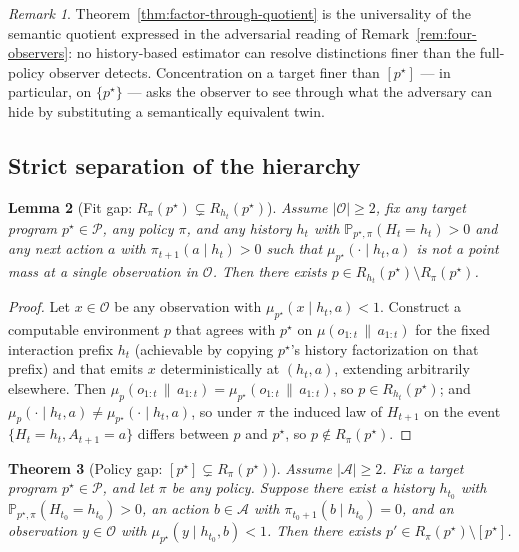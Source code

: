\documentclass[11pt]{article}
\newtheorem{theorem}{Theorem}[section]
\newtheorem{lemma}[theorem]{Lemma}
\theoremstyle{definition}
\theoremstyle{remark}
\newtheorem{remark}[theorem]{Remark}
\newcommand{\Acal}{\mathcal{A}}
\newcommand{\Ocal}{\mathcal{O}}
\newcommand{\Pcal}{\mathcal{P}}
\newcommand{\Prob}{\mathbb{P}}
\newcommand{\givena}{\,\|\,}
\begin{document}
\begin{remark}
Theorem~\ref{thm:factor-through-quotient} is the universality of the semantic quotient expressed in the adversarial reading of Remark~\ref{rem:four-observers}: no history-based estimator can resolve distinctions finer than the full-policy observer detects. Concentration on a target finer than $[p^\star]$ --- in particular, on $\{p^\star\}$ --- asks the observer to see through what the adversary can hide by substituting a semantically equivalent twin.
\end{remark}

\subsection{Strict separation of the hierarchy}

\begin{lemma}[{Fit gap: $R_\pi(p^\star)\subsetneq R_{h_t}(p^\star)$}]
\label{lem:fit-gap}
Assume $|\Ocal|\ge 2$, fix any target program $p^\star\in\Pcal$, any policy $\pi$, and any history $h_t$ with $\Prob_{p^\star,\pi}(H_t=h_t)>0$ and any next action $a$ with $\pi_{t+1}(a\mid h_t)>0$ such that $\mu_{p^\star}(\cdot\mid h_t,a)$ is not a point mass at a single observation in $\Ocal$. Then there exists $p\in R_{h_t}(p^\star)\setminus R_\pi(p^\star)$.
\end{lemma}

\begin{proof}
Let $x\in\Ocal$ be any observation with $\mu_{p^\star}(x\mid h_t,a)<1$. Construct a computable environment $p$ that agrees with $p^\star$ on $\mu(o_{1:t}\givena a_{1:t})$ for the fixed interaction prefix $h_t$ (achievable by copying $p^\star$'s history factorization on that prefix) and that emits $x$ deterministically at $(h_t,a)$, extending arbitrarily elsewhere. Then $\mu_p(o_{1:t}\givena a_{1:t})=\mu_{p^\star}(o_{1:t}\givena a_{1:t})$, so $p\in R_{h_t}(p^\star)$; and $\mu_p(\cdot\mid h_t,a)\neq \mu_{p^\star}(\cdot\mid h_t,a)$, so under $\pi$ the induced law of $H_{t+1}$ on the event $\{H_t=h_t,A_{t+1}=a\}$ differs between $p$ and $p^\star$, so $p\notin R_\pi(p^\star)$.
\end{proof}

\begin{theorem}[{Policy gap: $[p^\star]\subsetneq R_\pi(p^\star)$}]
\label{thm:policy-gap}
Assume $|\Acal|\ge 2$. Fix a target program $p^\star\in\Pcal$, and let $\pi$ be any policy. Suppose there exist a history $h_{t_0}$ with $\Prob_{p^\star,\pi}(H_{t_0}=h_{t_0})>0$, an action $b\in\Acal$ with $\pi_{t_0+1}(b\mid h_{t_0})=0$, and an observation $y\in\Ocal$ with $\mu_{p^\star}(y\mid h_{t_0},b)<1$. Then there exists $p'\in R_\pi(p^\star)\setminus [p^\star]$.
\end{theorem}
\end{document}
